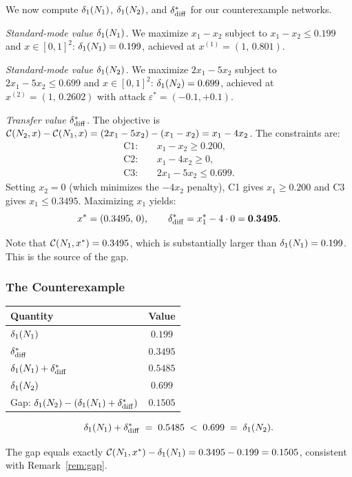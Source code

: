 We now compute $\delta_1(N_{1})$, $\delta_1(N_{2})$, and $\delta_{\mathrm{diff}}^{*}$ for our counterexample networks.

\emph{Standard-mode value $\delta_1(N_{1})$.} We maximize $x_1-x_2$ subject to $x_1-x_2\leq 0.199$ and $x\in[0,1]^2$: $\delta_1(N_{1})=0.199$, achieved at $x^{(1)}=(1,\,0.801)$.

\emph{Standard-mode value $\delta_1(N_{2})$.} We maximize $2x_1-5x_2$ subject to $2x_1-5x_2\leq 0.699$ and $x\in[0,1]^2$: $\delta_1(N_{2})=0.699$, achieved at $x^{(2)}=(1,\,0.2602)$ with attack $\varepsilon^*=(-0.1,+0.1)$.

\emph{Transfer value $\delta_{\mathrm{diff}}^{*}$.} The objective is $\mathcal{C}(N_2,x)-\mathcal{C}(N_1,x)=(2x_1-5x_2)-(x_1-x_2)=x_1-4x_2$. The constraints are:
\begin{align*}
  \mathrm{C1}:&\quad x_1-x_2\geq 0.200,\\
  \mathrm{C2}:&\quad x_1-4x_2\geq 0,\\
  \mathrm{C3}:&\quad 2x_1-5x_2\leq 0.699.
\end{align*}
Setting $x_2=0$ (which minimizes the $-4x_2$ penalty), C1 gives $x_1\geq 0.200$ and C3 gives $x_1\leq 0.3495$. Maximizing $x_1$ yields:
\[
  x^*=(0.3495,\,0),
  \qquad
  \delta_{\mathrm{diff}}^{*}=x_1^*-4\cdot 0=\mathbf{0.3495}.
\]

Note that $\mathcal{C}(N_1,x^*)=0.3495$, which is substantially larger than $\delta_1(N_{1})=0.199$. This is the source of the gap.

\subsubsection{The Counterexample}

\begin{center}
\renewcommand{\arraystretch}{1.5}
\begin{tabular}{lc}
\toprule
Quantity & Value \\
\midrule
$\delta_1(N_{1})$ & $0.199$ \\
$\delta_{\mathrm{diff}}^{*}$ & $0.3495$ \\
$\delta_1(N_{1})+\delta_{\mathrm{diff}}^{*}$ & $\mathbf{0.5485}$ \\
\midrule
$\delta_1(N_{2})$ & $\mathbf{0.699}$ \\
\midrule
Gap: $\delta_1(N_{2})-(\delta_1(N_{1})+\delta_{\mathrm{diff}}^{*})$ & $\mathbf{0.1505}$ \\
\bottomrule
\end{tabular}
\end{center}

\[
  \delta_1(N_{1})+\delta_{\mathrm{diff}}^{*} \;=\; 0.5485 \;\;\mathbf{<}\;\; 0.699 \;=\; \delta_1(N_{2}).
\]

The gap equals exactly $\mathcal{C}(N_1,x^*)-\delta_1(N_{1})=0.3495-0.199=0.1505$, consistent with Remark~\ref{rem:gap}.

